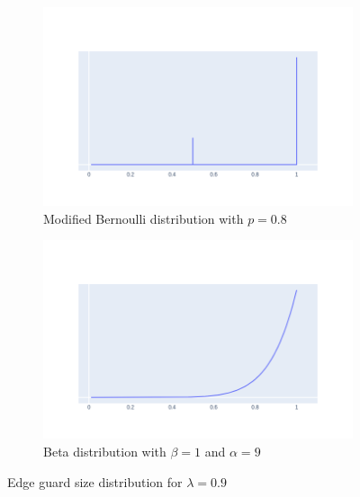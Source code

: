 \begin{figure}[H]
\centering
\begin{subfigure}{.5\textwidth}
	\centering
	\includegraphics[width=\linewidth]{Dists/Bernoulli90.png}
	\caption{Modified Bernoulli distribution with $p=0.8$}
\end{subfigure}%
\begin{subfigure}{.5\textwidth}
	\centering
	\includegraphics[width=\linewidth]{Dists/Beta90.png}
	\caption{Beta distribution with $\beta=1$ and $\alpha=9$}
\end{subfigure}
\caption{Edge guard size distribution for $\lambda = 0.9$}
\label{fig:dist_lambda90}
\end{figure}

